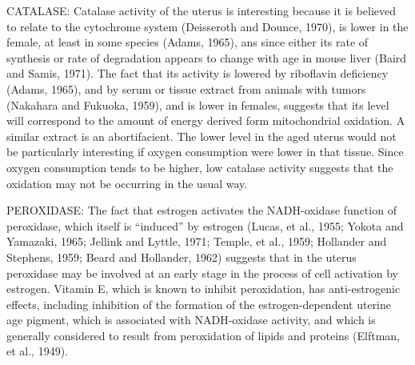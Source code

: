 CATALASE: Catalase activity of the uterus is interesting because it is believed to relate to the cytochrome system (Deisseroth and Dounce, 1970), is lower in the female, at least in some species (Adams, 1965), ans since either its rate of synthesis or rate of degradation appears to change with age in mouse liver (Baird and Samis, 1971). The fact that its activity is lowered by riboflavin deficiency (Adams, 1965), and by serum or tissue extract from animals with tumors (Nakahara and Fukuoka, 1959), and is lower in females, suggests that its level will correspond to the amount of energy derived form mitochondrial oxidation. A similar extract is an abortifacient. The lower level in the aged uterus would not be particularly interesting if oxygen consumption were lower in that tissue. Since oxygen consumption tends to be higher, low catalase activity suggests that the oxidation may not be occurring in the usual way.

PEROXIDASE: The fact that estrogen activates the NADH-oxidase function of peroxidase, which itself is ``induced'' by estrogen (Lucas, et al., 1955; Yokota and Yamazaki, 1965; Jellink and Lyttle, 1971; Temple, et al., 1959; Hollander and Stephens, 1959; Beard and Hollander, 1962) suggests that in the uterus peroxidase may be involved at an early stage in the process of cell activation by estrogen. Vitamin E, which is known to inhibit peroxidation, has anti-estrogenic effects, including inhibition of the formation of the estrogen-dependent uterine age pigment, which is associated with NADH-oxidase activity, and which is generally considered to result from peroxidation of lipids and proteins (Elftman, et al., 1949).

